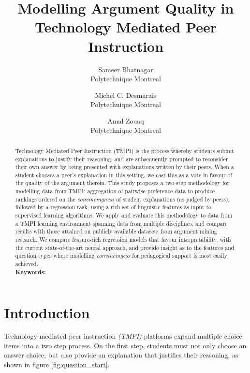 \documentclass[notitlepage,12pt]{jedm}
\begin{document}
	
	\title{Modelling Argument Quality in Technology Mediated Peer Instruction}
	\date{} %
	
	\author{
		{\large Sameer Bhatnagar}
		\\Polytechnique Montreal
	 	\and 
	 	{\large Michel C. Desmarais}
	 	\\Polytechnique Montreal
	 	\and 
	 	{\large Amal Zouaq}
 		\\Polytechnique Montreal
 }

	
	\maketitle
	
	\begin{abstract}
		Technology Mediated Peer Instruction (TMPI) is the process whereby 
		students submit explanations to justify their reasoning, and are 
		subsequently prompted to reconsider their own answer by being presented 
		with explanations written by their peers. 
		When a student chooses a peer's explanation in this setting, we cast 
		this as a vote in favour of the quality of the argument therein.
		This study proposes a two-step methodology for modelling data from 
		TMPI: aggregation of pairwise preference data to produce rankings 
		ordered on the \textit{convincingness} of student explanations (as 
		judged by peers), followed by a regression task, using a rich set of 
		linguistic features as input to supervised learning algorithms.
		We apply and evaluate this methodology to data from a TMPI learning 
		environment spanning data from multiple disciplines, and compare 
		results with those attained on publicly available datasets from 
		argument mining research. 
		We compare feature-rich regression models that favour interpretability, 
		with the current state-of-the-art neural approach, and provide 
		insight as to the features and question types where modelling 
		\textit{convincingess} for pedagogical support is most easily achieved.
		\\ %
		{\parindent0pt
			\textbf{Keywords:} 
		}
	\end{abstract}

\section{Introduction}
Technology-mediated peer instruction \textit{(TMPI)} platforms 
\cite{charles_harnessing_2019}\cite{univeristy_of_british_columbia_ubc/ubcpi_2019}
expand multiple choice items into a two step process.
On the first step, students must not only choose an answer choice, but also 
provide an explanation that justifies their reasoning, as shown in figure 
\ref{fig:question_start}.
\end{document}
